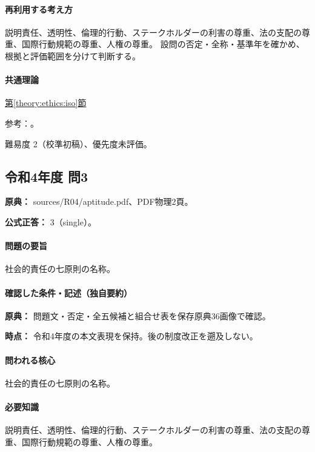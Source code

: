 \paragraph{再利用する考え方} 説明責任、透明性、倫理的行動、ステークホルダーの利害の尊重、法の支配の尊重、国際行動規範の尊重、人権の尊重。 設問の否定・全称・基準年を確かめ、根拠と評価範囲を分けて判断する。

\paragraph{共通理論} \hyperref[theory:ethics:iso]{第\ref*{theory:ethics:iso}節}

\par 参考：\cite{eth54_iso_brochure,iso26000}。

\par 難易度 2（校準初稿）、優先度未評価。

\subsection{令和4年度 問3}
\label{q:r04-reg-apt-03}

\noindent\textbf{原典：} sources/R04/aptitude.pdf、PDF物理2頁。

\textbf{公式正答：} 3（single）。

\paragraph{問題の要旨} 社会的責任の七原則の名称。

\paragraph{確認した条件・記述（独自要約）}\mbox{}\par

\noindent\textbf{原典：} 問題文・否定・全五候補と組合せ表を保存原典36画像で確認。\par

\noindent\textbf{時点：} 令和4年度の本文表現を保持。後の制度改正を遡及しない。\par

\paragraph{問われる核心} 社会的責任の七原則の名称。

\paragraph{必要知識} 説明責任、透明性、倫理的行動、ステークホルダーの利害の尊重、法の支配の尊重、国際行動規範の尊重、人権の尊重。

